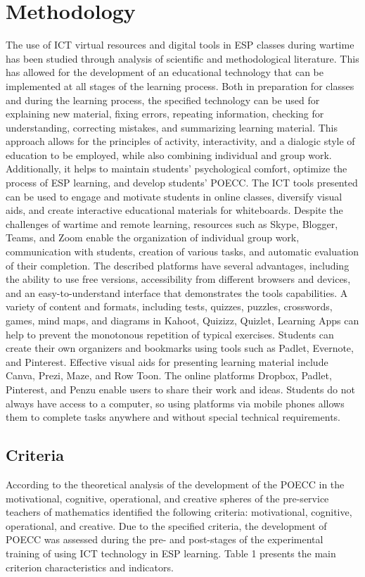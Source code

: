 \section{Methodology}\label{sec-methodology}
The use of ICT virtual resources and digital tools in ESP classes during
wartime has been studied through analysis of scientific and
methodological literature. This has allowed for the development of an
educational technology that can be implemented at all stages of the
learning process. Both in preparation for classes and during the
learning process, the specified technology can be used for explaining
new material, fixing errors, repeating information, checking for
understanding, correcting mistakes, and summarizing learning material.
This approach allows for the principles of activity, interactivity, and
a dialogic style of education to be employed, while also combining
individual and group work. Additionally, it helps to maintain students'
psychological comfort, optimize the process of ESP learning, and develop
students' POECC. The ICT tools presented can be used to engage and
motivate students in online classes, diversify visual aids, and create
interactive educational materials for whiteboards. Despite the
challenges of wartime and remote learning, resources such as Skype,
Blogger, Teams, and Zoom enable the organization of individual group
work, communication with students, creation of various tasks, and
automatic evaluation of their completion. The described platforms have
several advantages, including the ability to use free versions,
accessibility from different browsers and devices, and an
easy-to-understand interface that demonstrates the
tool\textquotesingle s capabilities. A\textbf{ }variety of content and
formats, including tests, quizzes, puzzles, crosswords, games, mind
maps, and diagrams in Kahoot, Quizizz, Quizlet, Learning Apps can
help to prevent the monotonous repetition of typical exercises. Students
can create their own organizers and bookmarks using tools such as
Padlet, Evernote, and Pinterest. Effective visual aids for presenting
learning material include Canva, Prezi, Maze, and Row Toon. The online
platforms Dropbox, Padlet, Pinterest, and Penzu enable users to share
their work and ideas. Students do not always have access to a computer,
so using platforms via mobile phones allows them to complete
tasks anywhere and without special technical requirements.

\subsection{Criteria}\label{subsec-criteria}
According to the theoretical analysis of the development of the POECC in
the motivational, cognitive, operational, and creative spheres of the
pre-service teachers of mathematics identified the following criteria:
motivational, cognitive, operational, and creative. Due to the specified
criteria, the development of POECC was assessed during the pre- and
post-stages of the experimental training of using ICT technology in ESP
learning. Table 1 presents the main criterion characteristics and
indicators.

